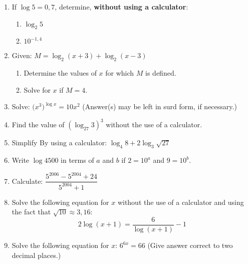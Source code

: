 \begin{eocexercises}{}
\begin{enumerate}
\item{If $\log 5 = 0,7$, determine, \textbf{without using a calculator}:
\begin{enumerate}
\item{$\log_2 5$}
\item{$10^{-1,4}$}
\end{enumerate}}

\item{Given: \qquad $M = \log_2 (x+3) + \log_2 (x-3)$
\begin{enumerate}
\item{Determine the values of $x$ for which $M$ is defined.}
\item{Solve for $x$ if $M = 4$.}
\end{enumerate}}

\item{Solve: \qquad $\biggl(x^3\biggr)^{\log x} = 10 x^2$ (Answer(s) may be left in surd form, if necessary.)}

\item{Find the value of $(\log_{27} 3)^3$ without the use of a calculator.}

\item{Simplify By using a calculator:  $\log_4 8 + 2 \log_3 \sqrt{27}$}

\item{Write $\log 4500$ in terms of $a$ and $b$ if $2=10^a$ and $9=10^b$.}

\item{Calculate: \qquad $\dfrac{5^{2006} - 5^{2004} + 24}{5^{2004} + 1}$}

\item{Solve the following equation for $x$ without the use of a calculator and using the fact that $\sqrt{10} \approx 3,16:$ $$2\log(x+1) = \dfrac{6}{\log(x+1)}-1$$}

\item{Solve the following equation for $x$: $6^{6x} = 66$ \quad (Give answer correct to two decimal places.)}

\end{enumerate}






\practiceinfo
\end{eocexercises}
